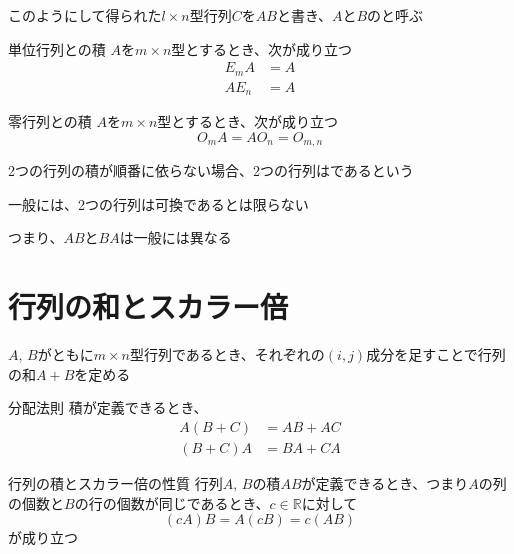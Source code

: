 \documentclass[../../../topic_linear-algebra]{subfiles}
\begin{document}
\br

このようにして得られた$l \times n$型行列$C$を$AB$と書き、$A$と$B$のと呼ぶ

\sectionline

\begin{theorem}{単位行列との積}
  $A$を$m \times n$型とするとき、次が成り立つ
  \begin{align*}
    E_mA & = A \\
    AE_n & = A
  \end{align*}
\end{theorem}

\begin{theorem}{零行列との積}
  $A$を$m \times n$型とするとき、次が成り立つ
  \begin{equation*}
    O_m A = A O_n = O_{m,n}
  \end{equation*}
\end{theorem}

\sectionline

2つの行列の積が順番に依らない場合、2つの行列はであるという

\br

一般には、2つの行列は可換であるとは限らない

つまり、$AB$と$BA$は一般には異なる

\br


\sectionline
\section{行列の和とスカラー倍}

$A, \, B$がともに$m \times n$型行列であるとき、それぞれの$(i, j)$成分を足すことで行列の和$A + B$を定める

\begin{theorem}{分配法則}
  積が定義できるとき、
  \begin{align*}
    A(B + C) & = AB + AC \\
    (B + C)A & = BA + CA
  \end{align*}
\end{theorem}

\begin{theorem}{行列の積とスカラー倍の性質}
  行列$A,\,B$の積$AB$が定義できるとき、つまり$A$の列の個数と$B$の行の個数が同じであるとき、$c \in \mathbb{R}$に対して
  \begin{equation*}
    (cA)B = A(cB) = c(AB)
  \end{equation*}
  が成り立つ
\end{theorem}
\end{document}
